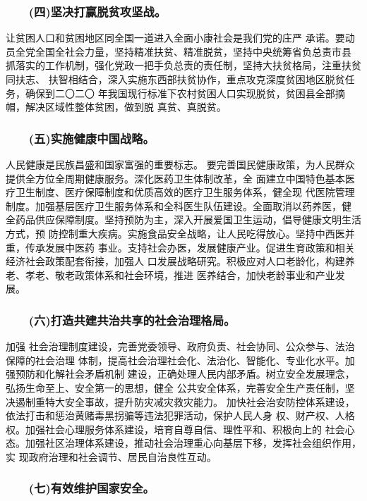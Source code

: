 \documentclass[11pt]{ctexart}
\begin{document}
{{{{\subsubsection{　　(四)坚决打赢脱贫攻坚战。}
\label{sec:orgad4da45}

让贫困人口和贫困地区同全国一道进入全面小康社会是我们党的庄严
承诺。要动员全党全国全社会力量，坚持精准扶贫、精准脱贫，坚持中央统筹省负总责市县
抓落实的工作机制，强化党政一把手负总责的责任制，坚持大扶贫格局，注重扶贫同扶志、
扶智相结合，深入实施东西部扶贫协作，重点攻克深度贫困地区脱贫任务，确保到二〇二〇
年我国现行标准下农村贫困人口实现脱贫，贫困县全部摘帽，解决区域性整体贫困，做到脱
真贫、真脱贫。

\subsubsection{　　(五)实施健康中国战略。}
\label{sec:org7809f61}

人民健康是民族昌盛和国家富强的重要标志。
要完善国民健康政策，为人民群众提供全方位全周期健康服务。深化医药卫生体制改革，全
面建立中国特色基本医疗卫生制度、医疗保障制度和优质高效的医疗卫生服务体系，健全现
代医院管理制度。加强基层医疗卫生服务体系和全科医生队伍建设。全面取消以药养医，健
全药品供应保障制度。坚持预防为主，深入开展爱国卫生运动，倡导健康文明生活方式，预
防控制重大疾病。实施食品安全战略，让人民吃得放心。坚持中西医并重，传承发展中医药
事业。支持社会办医，发展健康产业。促进生育政策和相关经济社会政策配套衔接，加强人
口发展战略研究。积极应对人口老龄化，构建养老、孝老、敬老政策体系和社会环境，推进
医养结合，加快老龄事业和产业发展。

\subsubsection{　　(六)打造共建共治共享的社会治理格局。}
\label{sec:org34e5273}

加强
社会治理制度建设，完善党委领导、政府负责、社会协同、公众参与、法治保障的社会治理
体制，提高社会治理社会化、法治化、智能化、专业化水平。加强预防和化解社会矛盾机制
建设，正确处理人民内部矛盾。树立安全发展理念，弘扬生命至上、安全第一的思想，健全
公共安全体系，完善安全生产责任制，坚决遏制重特大安全事故，提升防灾减灾救灾能力。
加快社会治安防控体系建设，依法打击和惩治黄赌毒黑拐骗等违法犯罪活动，保护人民人身
权、财产权、人格权。加强社会心理服务体系建设，培育自尊自信、理性平和、积极向上的
社会心态。加强社区治理体系建设，推动社会治理重心向基层下移，发挥社会组织作用，实
现政府治理和社会调节、居民自治良性互动。

\subsubsection{　　(七)有效维护国家安全。}
\label{sec:orgfc7d5c0}

}}}}
\end{document}
